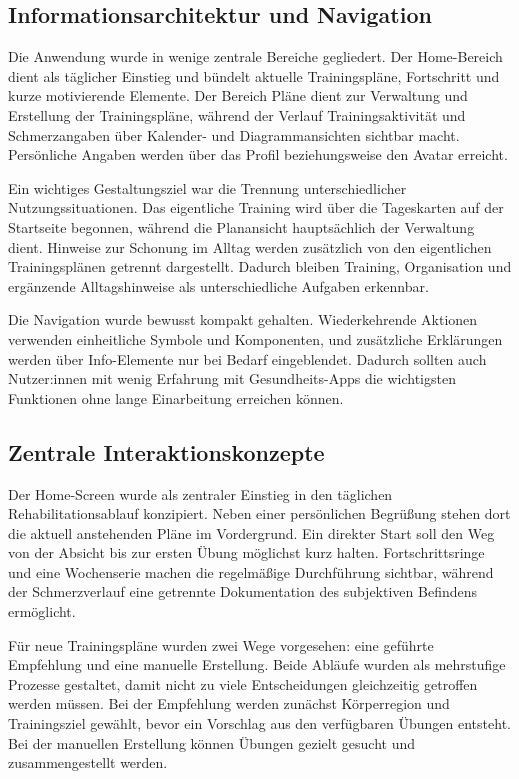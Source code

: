 \subsection{Informationsarchitektur und Navigation}

Die Anwendung wurde in wenige zentrale Bereiche gegliedert. Der Home-Bereich dient als täglicher Einstieg und bündelt aktuelle Trainingspläne, Fortschritt und kurze motivierende Elemente. Der Bereich Pläne dient zur Verwaltung und Erstellung der Trainingspläne, während der Verlauf Trainingsaktivität und Schmerzangaben über Kalender- und Diagrammansichten sichtbar macht. Persönliche Angaben werden über das Profil beziehungsweise den Avatar erreicht.

Ein wichtiges Gestaltungsziel war die Trennung unterschiedlicher Nutzungssituationen. Das eigentliche Training wird über die Tageskarten auf der Startseite begonnen, während die Planansicht hauptsächlich der Verwaltung dient. Hinweise zur Schonung im Alltag werden zusätzlich von den eigentlichen Trainingsplänen getrennt dargestellt. Dadurch bleiben Training, Organisation und ergänzende Alltagshinweise als unterschiedliche Aufgaben erkennbar.

Die Navigation wurde bewusst kompakt gehalten. Wiederkehrende Aktionen verwenden einheitliche Symbole und Komponenten, und zusätzliche Erklärungen werden über Info-Elemente nur bei Bedarf eingeblendet. Dadurch sollten auch Nutzer:innen mit wenig Erfahrung mit Gesundheits-Apps die wichtigsten Funktionen ohne lange Einarbeitung erreichen können.

\subsection{Zentrale Interaktionskonzepte}

Der Home-Screen wurde als zentraler Einstieg in den täglichen Rehabilitationsablauf konzipiert. Neben einer persönlichen Begrüßung stehen dort die aktuell anstehenden Pläne im Vordergrund. Ein direkter Start soll den Weg von der Absicht bis zur ersten Übung möglichst kurz halten. Fortschrittsringe und eine Wochenserie machen die regelmäßige Durchführung sichtbar, während der Schmerzverlauf eine getrennte Dokumentation des subjektiven Befindens ermöglicht.

Für neue Trainingspläne wurden zwei Wege vorgesehen: eine geführte Empfehlung und eine manuelle Erstellung. Beide Abläufe wurden als mehrstufige Prozesse gestaltet, damit nicht zu viele Entscheidungen gleichzeitig getroffen werden müssen. Bei der Empfehlung werden zunächst Körperregion und Trainingsziel gewählt, bevor ein Vorschlag aus den verfügbaren Übungen entsteht. Bei der manuellen Erstellung können Übungen gezielt gesucht und zusammengestellt werden.


